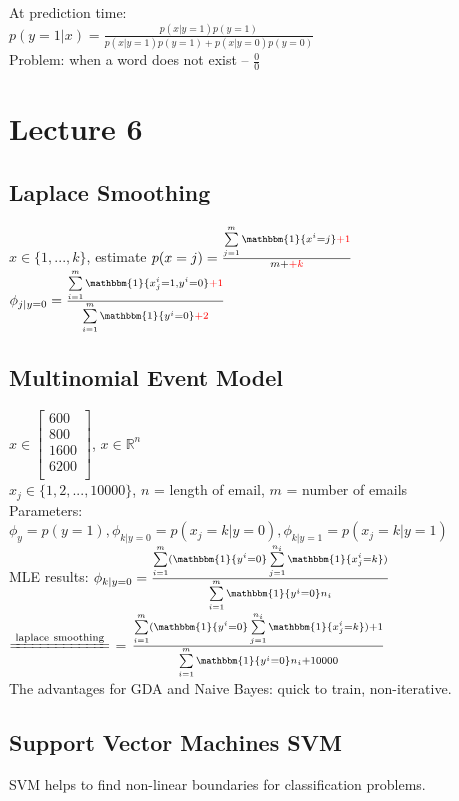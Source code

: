 \documentclass{article}
\begin{document}
\noindent
At prediction time:\\
$p(y=1|x) = \frac{p(x|y=1)p(y=1)}{p(x|y=1)p(y=1)+p(x|y=0)p(y=0)}$\\
Problem: when a word does not exist -- $\frac{0}{0}$

\section{Lecture 6}
\subsection{Laplace Smoothing}
$x \in \{1, ..., k\}$, estimate $p(x=j) = \frac{\sum\limits_{j=1}^m\mathbbm{1}\{x^i=j\} {\color{red} + 1}}{m + {\color{red} + k}}$\\
$\phi_{j|y=0} = \frac{\sum\limits_{i=1}^m\mathbbm{1}\{x_j^i=1,y^i=0\} {\color{red} + 1}}{\sum\limits_{i=1}^m\mathbbm{1}\{y^i=0\}{\color{red} + 2}}$

\subsection{Multinomial Event Model}
$x \in 
\begin{bmatrix}
600\\
800\\
1600\\
6200\\
\end{bmatrix}$, $x \in \mathbb{R}^n$\\
$x_j \in \{1, 2, ..., 10000\}$, $n$ = length of email, $m$ = number of emails\\
Parameters: $\phi_y=p(y=1), \phi_{k|y=0} = p(x_j=k|y=0), \phi_{k|y=1} = p(x_j=k|y=1)$\\

\noindent
MLE results: $\phi_{k|y=0} = \frac{\sum\limits_{i=1}^m (\mathbbm{1}\{y^i=0\}\sum\limits_{j=1}^{n_i} \mathbbm{1}\{x_j^i=k\})}{\sum\limits_{i=1}^m \mathbbm{1}\{y^i=0\}n_i}$\\
$\xlongequal{{\rm laplace\ smoothing}}$ = $\frac{\sum\limits_{i=1}^m (\mathbbm{1}\{y^i=0\}\sum\limits_{j=1}^{n_i} \mathbbm{1}\{x_j^i=k\}) + 1}{\sum\limits_{i=1}^m \mathbbm{1}\{y^i=0\}n_i + 10000}$\\

\noindent
The advantages for GDA and Naive Bayes: quick to train, non-iterative.

\subsection{Support Vector Machines {SVM}}
SVM helps to find non-linear boundaries for classification problems.
\end{document}

